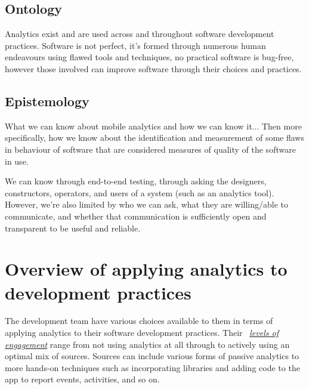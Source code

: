 \subsection{Ontology}
Analytics exist and are used across and throughout software development practices. Software is not perfect, it's formed through numerous human endeavours using flawed tools and techniques, no practical software is bug-free, however those involved can improve software through their choices and practices.

\subsection{Epistemology}
What we can know about mobile analytics and how we can know it... Then more specifically, how we know about the identification and measurement of some flaws in behaviour of software that are considered measures of quality of the software in use. 

We can know through end-to-end testing, through asking the designers, constructors, operators, and users of a system (such as an analytics tool). However, we're also limited by who we can ask, what they are willing/able to communicate, and whether that communication is sufficiently open and transparent to be useful and reliable.


\section{Overview of applying analytics to development practices}
The development team have various choices available to them in terms of applying analytics to their software development practices. Their ~\href{subsection-levels-of-engagement}{\emph{levels of engagement}} range from not using analytics at all through to actively using an optimal mix of sources. 
Sources can include various forms of passive analytics to more hands-on techniques such as incorporating libraries and adding code to the app to report events, activities, and so on.

